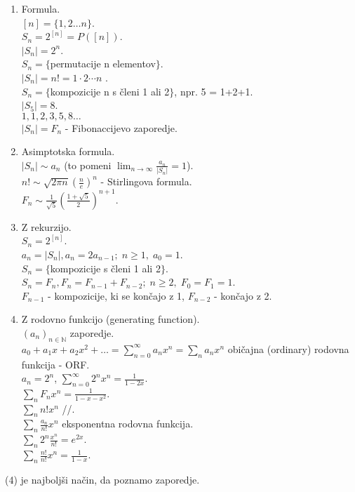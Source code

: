 \documentclass[a4paper, 12pt]{book}
\theoremstyle{definition}
\theoremstyle{remark}
\newcommand{\N}{\mathbb{N}}
\begin{document}
\begin{enumerate}[label=(\arabic{*})]
  \item Formula. \\
    $[n] = \{1, 2 \dots n\}$. \\
    $S_n = 2^{[n]} = P([n])$. \\
    $|S_n| = 2^n$. \\
    $S_n = \{$permutacije n elementov$\}$. \\
    $|S_n| = n! = 1 \cdot 2 \cdots n$  . \\
    $S_n = \{$kompozicije n s členi 1 ali 2$\}$, npr. 5 = 1+2+1. \\
    $|S_5| = 8$. \\
    $1, 1, 2, 3, 5, 8 \dots$ \\
    $|S_n| = F_n$ - Fibonaccijevo zaporedje.
  \item Asimptotska formula. \\
    $|S_n| \sim a_n$ (to pomeni $\lim_{n \to \infty} \frac{a_n}{|S_n|} = 1$). \\
    $n! \sim \sqrt{2 \pi n} \left(\frac{n}{e}\right)^n$ - Stirlingova formula. \\
    $F_n \sim \frac{1}{\sqrt{5}} \left(\frac{1+\sqrt{5}}{2}\right)^{n+1}$.
  \item Z rekurzijo. \\
    $S_n = 2^{[n]}$. \\
    $a_n = |S_n|, a_n = 2a_{n-1}; \; n \geq 1, \; a_0 = 1$. \\
    $S_n = \{$kompozicije s členi 1 ali 2$\}$. \\
    $S_n = F_n, F_n = F_{n-1} + F_{n-2}; \; n \geq 2, \; F_0 = F_1 = 1$. \\
    $F_{n-1}$ - kompozicije, ki se končajo z 1, $F_{n-2}$ - končajo z 2.
  \item Z rodovno funkcijo (generating function). \\
    $(a_n)_{n \in \N}$ zaporedje. \\
    $a_0 + a_1 x + a_2 x^2 + \dots = \sum_{n=0}^{\infty} a_n x^n = \sum_n a_n x^n$
      običajna (ordinary) rodovna funkcija - ORF. \\
    $a_n = 2^n$, $\sum_{n=0}^{\infty} 2^n x^n = \frac{1}{1-2x}$. \\
    $\sum_n F_n x^n = \frac{1}{1-x-x^2}$. \\
    $\sum_n n! x^n$ //. \\
    $\sum_n \frac{a_n}{n!} x^n$ eksponentna rodovna funkcija. \\
    $\sum_n 2^n \frac{x^n}{n!} = e^{2x}$. \\
    $\sum_n \frac{n!}{n!} x^n = \frac{1}{1-x}$.
\end{enumerate}
%
(4) je najboljši način, da poznamo zaporedje.
\end{document}
